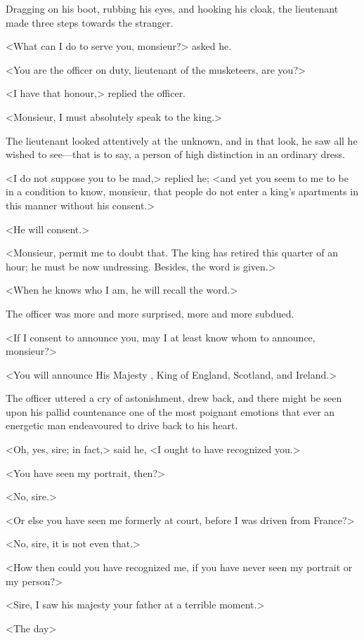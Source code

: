 Dragging on his boot, rubbing his eyes, and hooking his cloak, the lieutenant made three steps towards the stranger.

<What can I do to serve you, monsieur?> asked he.

<You are the officer on duty, lieutenant of the musketeers, are you?>

<I have that honour,> replied the officer.

<Monsieur, I must absolutely speak to the king.>

The lieutenant looked attentively at the unknown, and in that look, he saw all he wished to see—that is to say, a person of high distinction in an ordinary dress.

<I do not suppose you to be mad,> replied he; <and yet you seem to me to be in a condition to know, monsieur, that people do not enter a king's apartments in this manner without his consent.>

<He will consent.>

<Monsieur, permit me to doubt that. The king has retired this quarter of an hour; he must be now undressing. Besides, the word is given.>

<When he knows who I am, he will recall the word.>

The officer was more and more surprised, more and more subdued.

<If I consent to announce you, may I at least know whom to announce, monsieur?>

<You will announce His Majesty , King of England, Scotland, and Ireland.>

The officer uttered a cry of astonishment, drew back, and there might be seen upon his pallid countenance one of the most poignant emotions that ever an energetic man endeavoured to drive back to his heart.

<Oh, yes, sire; in fact,> said he, <I ought to have recognized you.>

<You have seen my portrait, then?>

<No, sire.>

<Or else you have seen me formerly at court, before I was driven from France?>

<No, sire, it is not even that.>

<How then could you have recognized me, if you have never seen my portrait or my person?>

<Sire, I saw his majesty your father at a terrible moment.>

<The day\longdash>

